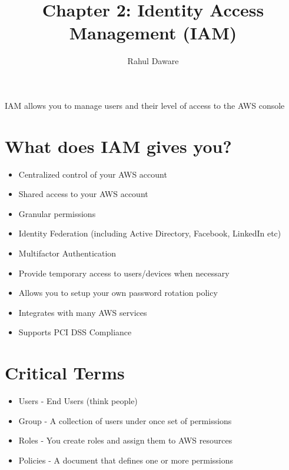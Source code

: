 \documentclass{article}
\author{Rahul Daware}
\begin{document}
\title{Chapter 2: Identity Access Management (IAM)}
\maketitle
\newpage
\tableofcontents
\newpage


IAM allows you to manage users and their level of access to the AWS console 

\section{What does IAM gives you?}
\begin{itemize}
\item
Centralized control of your AWS account

\item
Shared access to your AWS account

\item
Granular permissions

\item
Identity Federation (including Active Directory, Facebook, LinkedIn etc)

\item
Multifactor Authentication

\item
Provide temporary access to users/devices when necessary

\item
Allows you to setup your own password rotation policy

\item
Integrates with many AWS services

\item
Supports PCI DSS Compliance
\end{itemize}

\section{Critical Terms}
\begin{itemize}
\item
Users - End Users (think people)

\item
Group - A collection of users under once set of permissions

\item
Roles - You create roles and assign them to AWS resources

\item
Policies - A document that defines one or more permissions

\end{itemize}
\end{document}
